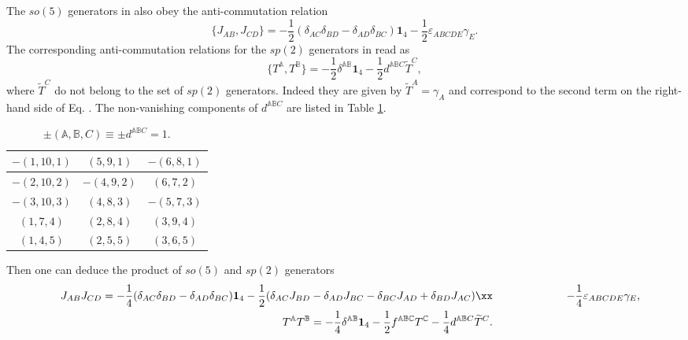 \documentclass[12pt,epsf]{article}
\begin{document}
The $so(5)$ generators in  also obey the anti-commutation relation
\begin{equation}\label{anti-so5}
  \{J_{AB}, J_{CD} \} = - \frac{1}{2} (\delta_{AC} \delta_{BD} - \delta_{AD} \delta_{BC}) \mathbf{1}_4
  - \frac{1}{2} \varepsilon_{ABCDE} \gamma_E.
\end{equation}
The corresponding anti-commutation relations for the $sp(2)$ generators in  read as
\begin{equation}\label{anti-sp5}
  \{T^\mathbb{A}, T^\mathbb{B} \} = - \frac{1}{2} \delta^{\mathbb{A}\mathbb{B}} \mathbf{1}_4
  - \frac{1}{2} d^{\mathbb{A}\mathbb{B} C} \widetilde{T}^C,
\end{equation}
where $\widetilde{T}^C$ do not belong to the set of $sp(2)$ generators.
Indeed they are given by $\widetilde{T}^A = \gamma_A$ and correspond to the second term on the right-hand side
of Eq. . The non-vanishing components of $d^{\mathbb{A}\mathbb{B} C}$ are listed in Table \ref{table-d}.
\begin{table}[ht]
\centering
\begin{tabular}{|c|c|c|}
  \hline
  $-(1,10,1)$ & $(5,9,1)$ & $-(6,8,1)$ \\
  \hline
  $- (2,10,2)$ & $-(4,9,2)$ & $(6,7,2)$ \\
  \hline
  $-(3,10,3)$ & $(4,8,3)$ & $-(5,7,3)$ \\
  \hline
  $(1,7,4)$ & $(2,8,4)$ & $(3,9,4)$ \\
  \hline
  $(1,4,5)$ & $(2,5,5)$ & $(3,6,5)$ \\
  \hline
\end{tabular}
\caption{$\pm(\mathbb{A},\mathbb{B}, C) \equiv \pm d^{\mathbb{A}\mathbb{B} C} = 1.$}
\label{table-d}
\end{table}
Then one can deduce the product of $so(5)$ and $sp(2)$ generators
\begin{eqnarray}\label{prod-gen1}
&& J_{AB} J_{CD} = - \frac{1}{4} (\delta_{AC} \delta_{BD} - \delta_{AD} \delta_{BC}) \mathbf{1}_4
   - \frac{1}{2} ( \delta_{AC} J_{BD} - \delta_{AD} J_{BC} - \delta_{BC} J_{AD} + \delta_{BD} J_{AC}) \xx
   && \hspace{2cm}   - \frac{1}{4} \varepsilon_{ABCDE} \gamma_E, \\
\label{prod-gen2}
&& T^\mathbb{A} T^\mathbb{B} = - \frac{1}{4} \delta^{\mathbb{A}\mathbb{B}} \mathbf{1}_4
  - \frac{1}{2} f^{\mathbb{A} \mathbb{B} \mathbb{C}} T^\mathbb{C}
  - \frac{1}{4} d^{\mathbb{A}\mathbb{B} C} \widetilde{T}^C.
\end{eqnarray}
\end{document}
